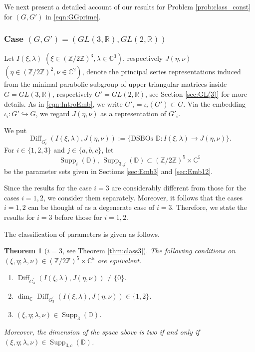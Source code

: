 \documentclass[a4paper,11pt,reqno]{amsart}
\newcommand{\CC}{\mathbb{C}}
\newcommand{\DD}{\mathbb{D}}
\newcommand{\RR}{\mathbb{R}}
\newcommand{\ZZ}{\mathbb{Z}}
\newcommand{\0}{{\bf 0}}
\newcommand{\Z}{\mathbb{Z}}
\newcommand{\R}{\mathbb{R}}
\newcommand{\C}{\mathbb{C}}
\newcommand{\1}{{\bf 1}}
\DeclareMathOperator{\Supp}{Supp}
\DeclareMathOperator{\Diff}{Diff}
\theoremstyle{plain}
\newtheorem{thmalph}{Theorem}
\theoremstyle{definition}
\numberwithin{equation}{section}
\theoremstyle{definition}
\begin{document}
We next present a detailed account of our results for Problem \ref{prob:class_const}
for $(G,G')$ in \eqref{eqn:GGprime}. 

\subsubsection{Case \texorpdfstring{$(G,G')=(GL(3,\R), GL(2,\R))$}{(G,G')=(GL(3,R),GL(2,R))}}
\label{sec:Intro_GL3GL2}

Let $I(\xi,\lambda)$ $(\xi\in (\ZZ/2\ZZ)^3,\lambda\in \CC^3)$, respectively 
$J(\eta,\nu)$ $(\eta\in (\ZZ/2\ZZ)^2,\nu\in \CC^2)$, denote 
the principal series representations
induced from the minimal parabolic subgroup of upper triangular matrices inside $G=GL(3,\RR)$, respectively $G'=GL(2,\RR)$, see Section \ref{sec:GL(3)} for more details. As in \eqref{eqn:IntroEmb}, we write $G'_i = \iota_i(G')\subset G$. 
Via the embedding $\iota_i \colon G' \hookrightarrow G$, 
we regard $J(\eta,\nu)$ as a representation of $G'_i$.

We put 
\begin{equation}\label{eqn:IntroDiff}
\Diff_{G_i^\prime}(I(\xi,\lambda),J(\eta,\nu)) 
:=\{\text{DSBOs $\DD \colon I(\xi,\lambda) \to J(\eta,\nu)$}\}.
\end{equation}
For $i\in \{1,2, 3\}$ and $j \in \{a ,b ,c \}$, let 
\begin{equation*}
\Supp_i(\DD),\, \Supp_{3,j}(\DD) \subset (\ZZ/2\ZZ)^5\times \CC^5
\end{equation*}
be the parameter sets 
given in Sections \ref{sec:Emb3} and \ref{sec:Emb12}.

Since the results for the case $i=3$ are considerably  different from 
those for the cases $i=1,2$, we consider them separately.
Moreover, it follows that the cases $i=1,2$ can be thought of as a degenerate case of $i=3$.
Therefore, we state the results for $i=3$ before those for $i=1,2$.

The classification of parameters is given as follows.

\begin{thmalph}[$i=3$, see Theorem \ref{thm:class3}]
\label{Intro:B}
The following conditions on $(\xi, \eta; \lambda, \nu) \in (\Z/2\Z)^5 \times \C^5$ are equivalent.
\begin{enumerate}[label = \normalfont{(\roman*)}]
    \item $\Diff_{G_3^\prime}\left(I(\xi, \lambda), J(\eta, \nu)\right) \neq \{0\}$.
    
    \item $\dim_\C \Diff_{G_3^\prime}\left(I(\xi, \lambda), J(\eta, \nu)\right) \in \{1, 2\}$.

    \item $(\xi, \eta; \lambda, \nu) \in \Supp_3(\DD)$.
\end{enumerate}
Moreover, the dimension of the space above is two if and only if $(\xi, \eta; \lambda, \nu) \in \Supp_{3,c}(\mathbb{D})$.
\end{thmalph}
\end{document}
